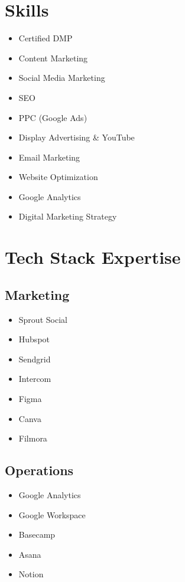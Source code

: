 \documentclass{article}
\begin{document}
\clearpage
\section*{Skills}
\begin{minipage}[t]{0.45\textwidth}
  \begin{itemize}
    \item Certified DMP
    \item Content Marketing
    \item Social Media Marketing
    \item SEO 
    \item PPC (Google Ads)
    \item Display Advertising \& YouTube
    \item Email Marketing
    \item Website Optimization
    \item Google Analytics
    \item Digital Marketing Strategy
  \end{itemize}
\end{minipage}
\begin{minipage}[t]{0.5\textwidth}
  \section*{Tech Stack Expertise}
  \begin{multicols}{2}
    \subsection*{Marketing}
    \begin{itemize}
      \item Sprout Social
      \item Hubspot
      \item Sendgrid
      \item Intercom 
      \item Figma
      \item Canva
      \item Filmora
    \end{itemize}

    \columnbreak
    \subsection*{Operations}
    \begin{itemize}
      \item Google Analytics
      \item Google Workspace
      \item Basecamp
      \item Asana
      \item Notion
    \end{itemize}
  \end{multicols}
\end{minipage}
\end{document}
